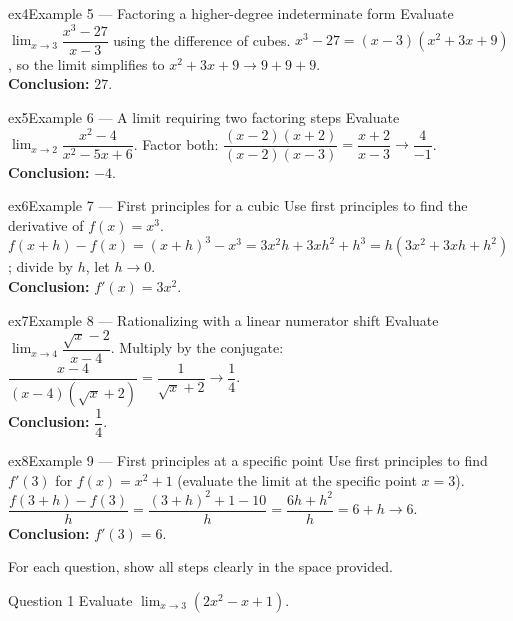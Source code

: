 \documentclass[11pt]{article}
\begin{document}
\begin{example}{ex4}{Example 5 --- Factoring a higher-degree indeterminate form}
Evaluate $\displaystyle\lim_{x\to3}\dfrac{x^3-27}{x-3}$ using the difference of cubes.\soln
$x^3-27=(x-3)(x^2+3x+9)$, so the limit simplifies to $x^2+3x+9\to9+9+9$.\\[3pt]\textbf{Conclusion:} $27$.
\end{example}

\begin{example}{ex5}{Example 6 --- A limit requiring two factoring steps}
Evaluate $\displaystyle\lim_{x\to2}\dfrac{x^2-4}{x^2-5x+6}$.\soln
Factor both: $\dfrac{(x-2)(x+2)}{(x-2)(x-3)}=\dfrac{x+2}{x-3}\to\dfrac{4}{-1}$.\\[3pt]\textbf{Conclusion:} $-4$.
\end{example}

\begin{example}{ex6}{Example 7 --- First principles for a cubic}
Use first principles to find the derivative of $f(x)=x^3$.\soln
$f(x+h)-f(x)=(x+h)^3-x^3=3x^2h+3xh^2+h^3=h(3x^2+3xh+h^2)$; divide by $h$, let $h\to0$.\\[3pt]\textbf{Conclusion:} $f'(x)=3x^2$.
\end{example}

\begin{example}{ex7}{Example 8 --- Rationalizing with a linear numerator shift}
Evaluate $\displaystyle\lim_{x\to4}\dfrac{\sqrt{x}-2}{x-4}$.\soln
Multiply by the conjugate: $\dfrac{x-4}{(x-4)(\sqrt x+2)}=\dfrac{1}{\sqrt x+2}\to\dfrac1{4}$.\\[3pt]\textbf{Conclusion:} $\dfrac14$.
\end{example}

\begin{example}{ex8}{Example 9 --- First principles at a specific point}
Use first principles to find $f'(3)$ for $f(x)=x^2+1$ (evaluate the limit at the specific point $x=3$).\soln
$\dfrac{f(3+h)-f(3)}h=\dfrac{(3+h)^2+1-10}h=\dfrac{6h+h^2}h=6+h\to6$.\\[3pt]\textbf{Conclusion:} $f'(3)=6$.
\end{example}

\clearpage
{}
For each question, show all steps clearly in the space provided.

\begin{qbox}{Question 1}
Evaluate $\displaystyle\lim_{x\to3}(2x^2-x+1)$.\workspace{2.4cm}
\end{qbox}
\end{document}
